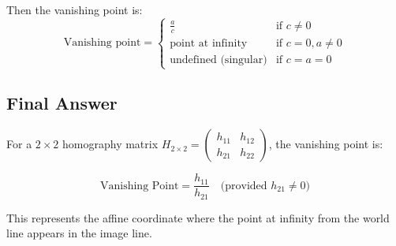 \documentclass[12pt]{article}
\begin{document}
Then the vanishing point is:
\[
\boxed{\text{Vanishing point} = \begin{cases}
\frac{a}{c} & \text{if } c \neq 0 \\
\text{point at infinity} & \text{if } c = 0, a \neq 0 \\
\text{undefined (singular)} & \text{if } c = a = 0
\end{cases}}
\]


\subsection*{Final Answer}

For a $2 \times 2$ homography matrix $H_{2 \times 2} = \begin{pmatrix} h_{11} & h_{12} \\ h_{21} & h_{22} \end{pmatrix}$, the vanishing point is:

\[
\boxed{\text{Vanishing Point} = \frac{h_{11}}{h_{21}} \quad \text{(provided } h_{21} \neq 0\text{)}}
\]

This represents the affine coordinate where the point at infinity from the world line appears in the image line.
\end{document}
